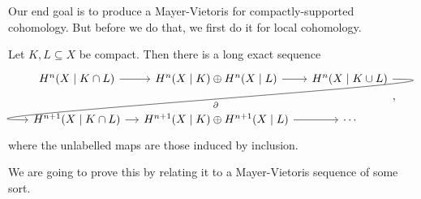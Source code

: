 \documentclass[a4paper]{article}
\begin{document}
Our end goal is to produce a Mayer-Vietoris for compactly-supported cohomology. But before we do that, we first do it for local cohomology.

\begin{prop}
  Let $K, L \subseteq X$ be compact. Then there is a long exact sequence
  \[
    \begin{tikzcd}[column sep=small]
      H^n(X \mid K \cap L) \ar[r] & H^n(X \mid K) \oplus H^n(X \mid L) \ar[r] & H^n(X \mid K \cup L) \ar[out=0, in=180, overlay, lld, "\partial"]\\
      H^{n + 1}(X \mid K \cap L) \ar[r] & H^{n + 1}(X \mid K) \oplus H^{n + 1}(X \mid L) \ar[r] & \cdots
    \end{tikzcd},
  \]
  where the unlabelled maps are those induced by inclusion.
\end{prop}
We are going to prove this by relating it to a Mayer-Vietoris sequence of some sort.
\end{document}
